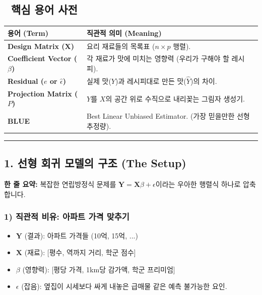 \documentclass[11pt,a4paper]{book}
\theoremstyle{definition}
\begin{document}
\subsection*{📝 핵심 용어 사전}
\begin{table}[h]
\centering
\begin{tabularx}{\textwidth}{|p{}|X|}
\hline
\textbf{용어 (Term)} & \textbf{직관적 의미 (Meaning)} \\
\hline
\textbf{Design Matrix ($\mathbf{X}$)} & 요리 재료들의 목록표 ($n \times p$ 행렬). \\
\hline
\textbf{Coefficient Vector ($\beta$)} & 각 재료가 맛에 미치는 영향력 (우리가 구해야 할 레시피). \\
\hline
\textbf{Residual ($e$ or $\hat{\epsilon}$)} & 실제 맛($Y$)과 레시피대로 만든 맛($\hat{Y}$)의 차이. \\
\hline
\textbf{Projection Matrix ($P$)} & $Y$를 $X$의 공간 위로 수직으로 내리꽂는 그림자 생성기. \\
\hline
\textbf{BLUE} & Best Linear Unbiased Estimator. (가장 믿을만한 선형 추정량). \\
\hline
\end{tabularx}
\end{table}

\vspace{0.5cm}\hrule\vspace{0.5cm}

\subsection{1. 선형 회귀 모델의 구조 (The Setup)}

\begin{conceptbox}[title={개념 1: 행렬로 세상을 표현하다}]
\textbf{한 줄 요약:} 복잡한 연립방정식 문제를 $\mathbf{Y} = \mathbf{X}\beta + \epsilon$이라는 우아한 행렬식 하나로 압축합니다.
\end{conceptbox}

\subsubsection*{1) 직관적 비유: 아파트 가격 맞추기}
\begin{itemize}
    \item $\mathbf{Y}$ (결과): 아파트 가격들 (10억, 15억, ...)
    \item $\mathbf{X}$ (재료): [평수, 역까지 거리, 학군 점수]
    \item $\beta$ (영향력): [평당 가격, 1km당 감가액, 학군 프리미엄]
    \item $\epsilon$ (잡음): 옆집이 시세보다 싸게 내놓은 급매물 같은 예측 불가능한 요인.
\end{itemize}
\end{document}
